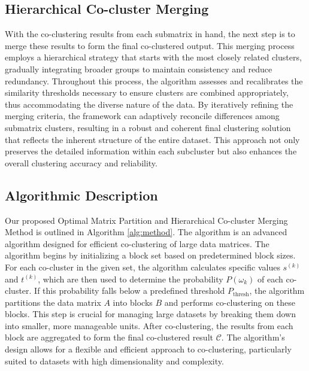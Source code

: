 \documentclass[letterpaper, 10 pt, conference]{ieeeconf}  %
\begin{document}
\subsection{Hierarchical Co-cluster Merging}

With the co-clustering results from each submatrix in hand, the next step is to merge these results to form the final co-clustered output. This merging process employs a hierarchical strategy that starts with the most closely related clusters, gradually integrating broader groups to maintain consistency and reduce redundancy. Throughout this process, the algorithm assesses and recalibrates the similarity thresholds necessary to ensure clusters are combined appropriately, thus accommodating the diverse nature of the data. By iteratively refining the merging criteria, the framework can adaptively reconcile differences among submatrix clusters, resulting in a robust and coherent final clustering solution that reflects the inherent structure of the entire dataset. This approach not only preserves the detailed information within each subcluster but also enhances the overall clustering accuracy and reliability.

\subsection{Algorithmic Description}
Our proposed  Optimal Matrix Partition and Hierarchical Co-cluster Merging Method is outlined in Algorithm \ref{alg:method}. The algorithm
is an advanced algorithm designed for efficient co-clustering of large data matrices. The algorithm begins by initializing a block set based on predetermined block sizes. For each co-cluster in the given set, the algorithm calculates specific values $s^{(k)}$ and $t^{(k)}$, which are then used to determine the probability $P(\omega_k)$ of each co-cluster. If this probability falls below a predefined threshold $P_{\text{thresh}}$, the algorithm partitions the data matrix $A$ into blocks $B$ and performs co-clustering on these blocks. This step is crucial for managing large datasets by breaking them down into smaller, more manageable units. After co-clustering, the results from each block are aggregated to form the final co-clustered result $\mathcal{C}$. The algorithm's design allows for a flexible and efficient approach to co-clustering, particularly suited to datasets with high dimensionality and complexity.
\end{document}
